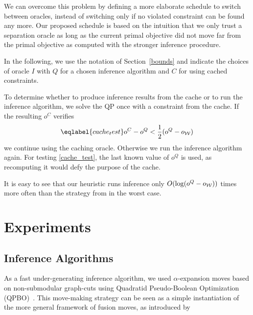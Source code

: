 We can overcome this problem by defining a more elaborate schedule to switch
between oracles, instead of switching only if no violated constraint can be
found any more. Our proposed schedule is based on the intuition that we only
trust a separation oracle as long as the current primal objective did not move
far from the primal objective as computed with the stronger inference
procedure.


In the following, we use the notation of Section~\ref{bounds} and indicate
the choices of oracle $I$ with $Q$ for a chosen inference algorithm and $C$ for
using cached constraints.

To determine whether to produce inference results from the cache or to run the inference algorithm,
we solve the QP once with a constraint from the cache. If the resulting $o^C$ verifies
\begin{equation}\eqlabel{cache_test}
    o^C - o^Q < \frac{1}{2} (o^Q - o_{\W})
\end{equation}
we continue using the caching oracle. Otherwise we run the inference algorithm again.
For testing \eqref{cache_test}, the last known value of $o^Q$ is used, as recomputing it would defy
the purpose of the cache.

It is easy to see that our heuristic runs inference only $O(\log(o^Q -
o_{\mathcal{W}}))$ times more often than the strategy from \citet{joachims2009cutting} in the
worst case.


\section{Experiments}

\subsection{Inference Algorithms}

As a fast under-generating inference algorithm, we used $\alpha$-expansion
moves based on non-submodular graph-cuts using Quadratid Pseudo-Boolean
Optimization (QPBO)~\citep{rother2007optimizing}.  This move-making strategy
can be seen as a simple instantiation of the more general framework of fusion
moves, as introduced by \citet{lempitsky2010fusion}

